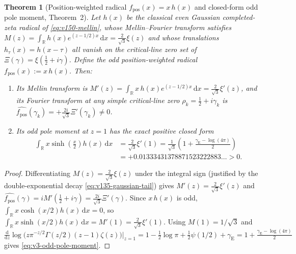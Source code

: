\documentclass[11pt]{article}
\newtheorem{theorem}{Theorem}[section]
\theoremstyle{remark}
\newcommand{\dd}{\mathrm d}
\begin{document}
\begin{theorem}[Position-weighted radical $f_{\mathrm{pos}}(x)=x\,h(x)$ and closed-form odd pole moment,  Theorem~2]\label{thm:v3-pos-radical-moment}
Let $h(x)$ be the classical even Gaussian completed-zeta radical of \eqref{eq:v150-mellin}, whose Mellin--Fourier transform satisfies $M(z)=\int_{\mathbb R}h(x)e^{(z-1/2)x}\,\dd x = \frac{2}{\sqrt 3}\xi(z)$ and whose translations $h_\tau(x)=h(x-\tau)$ all vanish on the critical-line zero set of $\Xi(\gamma)=\xi(\tfrac12+i\gamma)$. Define the odd position-weighted radical $f_{\mathrm{pos}}(x):=x\,h(x)$. Then:
\begin{enumerate}[label=(\alph*)]
\item Its Mellin transform is $M'(z)=\int_{\mathbb R}x\,h(x)e^{(z-1/2)x}\,\dd x = \frac{2}{\sqrt 3}\xi'(z)$, and its Fourier transform at any simple critical-line zero $\rho_k=\tfrac12+i\gamma_k$ is $\widehat{f_{\mathrm{pos}}}(\gamma_k)=+\frac{2i}{\sqrt 3}\Xi'(\gamma_k)\ne 0$.
\item Its odd pole moment at $z=1$ has the exact positive closed form
\begin{align}\label{eq:v3-odd-pole-moment}
 \int_{\mathbb R}x\sinh\!\left(\frac{x}{2}\right)h(x)\,\dd x &= \frac{2}{\sqrt 3}\xi'(1) = \frac{1}{\sqrt 3}\!\left(1+\frac{\gamma_{\mathrm{E}}-\log(4\pi)}{2}\right)\nonumber\\
 &= +0.01333431378871523222883\dots > 0.
\end{align}
\end{enumerate}
\end{theorem}
\begin{proof}
Differentiating $M(z)=\frac{2}{\sqrt 3}\xi(z)$ under the integral sign (justified by the double-exponential decay \eqref{eq:v135-gaussian-tail}) gives $M'(z)=\frac{2}{\sqrt 3}\xi'(z)$ and $\widehat{f_{\mathrm{pos}}}(\gamma)=iM'(\tfrac12+i\gamma)=\frac{2i}{\sqrt 3}\Xi'(\gamma)$. Since $x\,h(x)$ is odd, $\int_{\mathbb R}x\cosh(x/2)h(x)\,\dd x=0$, so $\int_{\mathbb R}x\sinh(x/2)h(x)\,\dd x = M'(1)=\frac{2}{\sqrt 3}\xi'(1)$. Using $M(1)=1/\sqrt 3$ and $\frac{\dd}{\dd z}\log\bigl(z\pi^{-z/2}\Gamma(z/2)(z-1)\zeta(z)\bigr)\big|_{z=1}=1-\tfrac12\log\pi+\tfrac12\psi(1/2)+\gamma_{\mathrm{E}}=1+\frac{\gamma_{\mathrm{E}}-\log(4\pi)}{2}$ gives \eqref{eq:v3-odd-pole-moment}.
\end{proof}
\end{document}
